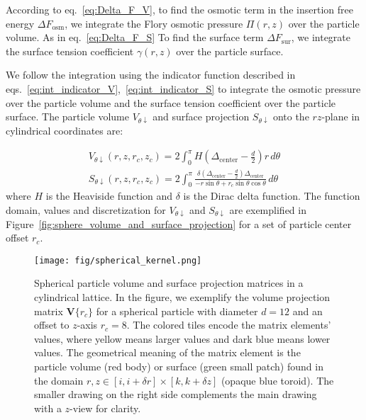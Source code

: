 \documentclass[10pt, a4paper]{article}
\begin{document}
\begin{multicols}{2}
According to eq.~\ref{eq:Delta_F_V}, to find the osmotic term in the insertion free energy $\Delta F_{\textrm{osm}}$, we integrate the Flory osmotic pressure $\Pi(r, z)$ over the particle volume.
As in eq.~\ref{eq:Delta_F_S} To find the surface term $\Delta F_{\textrm{sur}}$, we integrate the surface tension coefficient $\gamma(r, z)$ over the particle surface.

We follow the integration using the indicator function described in eqs.~\ref{eq:int_indicator_V},~\ref{eq:int_indicator_S} to integrate the osmotic pressure over the particle volume and the surface tension coefficient over the particle surface.
The particle volume $V_{\theta \downarrow}$ and surface projection $S_{\theta \downarrow}$ onto the $rz$-plane in cylindrical coordinates are:

\begin{gather}
    V_{\theta \downarrow}(r, z, r_c, z_c) = 2\int_{0}^{\pi} H\left( \Delta_{\textrm{center}} - \frac{d}{2} \right) r \, d\theta
    \\
    S_{\theta \downarrow}(r, z, r_c, z_c) = 2\int_{0}^{\pi} \frac{\delta \left( \Delta_{\textrm{center}} - \frac{d}{2} \right) \Delta_{\textrm{center}}}{-r \sin \theta + r_c \sin \theta \cos \theta} \, d\theta
\end{gather}
where $H$ is the Heaviside function and $\delta$ is the Dirac delta function.
The function domain, values and discretization for $V_{\theta \downarrow}$ and $S_{\theta \downarrow}$ are exemplified in Figure~\ref{fig:sphere_volume_and_surface_projection} for a set of particle center offset $r_c$.

\begin{figure}[H]
    \centering
    \texttt{[image: fig/spherical\_kernel.png]}
    \caption{
        Spherical particle volume and surface projection matrices in a cylindrical lattice.
        In the figure, we exemplify the volume projection matrix $\bm{V}\{r_c\}$ for a spherical particle with diameter $d = 12$ and an offset to $z$-axis $r_c= 8$.
        The colored tiles encode the matrix elements' values, where yellow means larger values and dark blue means lower values.
        The geometrical meaning of the matrix element is the particle volume (red body) or surface (green small patch) found in the domain $r,z \in [i, i + \delta r] \times [k, k + \delta z]$ (opaque blue toroid).
        The smaller drawing on the right side complements the main drawing with a $z$-view for clarity.
    }
    \label{fig:spherical_kernel}
\end{figure}


\end{multicols}
\end{document}
